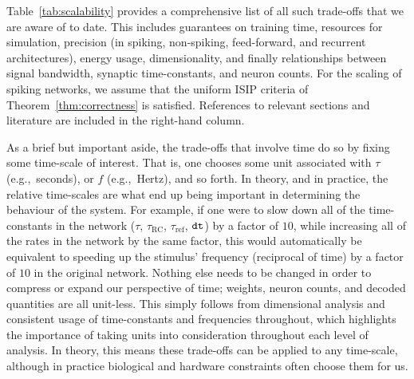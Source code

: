 
Table~\ref{tab:scalability} provides a comprehensive list of all such trade-offs that we are aware of to date.
This includes guarantees on training time, resources for simulation, precision (in spiking, non-spiking, feed-forward, and recurrent architectures), energy usage, dimensionality, and finally relationships between signal bandwidth, synaptic time-constants, and neuron counts.
For the scaling of spiking networks, we assume that the uniform ISIP criteria of Theorem~\ref{thm:correctness} is satisfied.
References to relevant sections and literature are included in the right-hand column.

As a brief but important aside, the trade-offs that involve time do so by fixing some time-scale of interest.
That is, one chooses some unit associated with $\tau$ (e.g.,~seconds), or $f$ (e.g.,~Hertz), and so forth.
In theory, and in practice, the relative time-scales are what end up being important in determining the behaviour of the system.
For example, if one were to slow down all of the time-constants in the network ($\tau$, $\tau_\text{RC}$, $\tau_\text{ref}$, $\texttt{dt}{}$) by a factor of $10$, while increasing all of the rates in the network by the same factor, this would automatically be equivalent to speeding up the stimulus' frequency (reciprocal of time) by a factor of $10$ in the original network.
Nothing else needs to be changed in order to compress or expand our perspective of time; weights, neuron counts, and decoded quantities are all unit-less.
This simply follows from dimensional analysis and consistent usage of time-constants and frequencies throughout, which highlights the importance of taking units into consideration throughout each level of analysis.
In theory, this means these trade-offs can be applied to any time-scale, although in practice biological and hardware constraints often choose them for us.

\iffalse
\TODO{Discuss all of the scaling.}
We usually set $n$ to about $50 \times q$, as this has been found to provide tolerable performance in practice~\citep{braindrop2019}. 
More neurons may be required depending on the difficulty of the function and the frequency of the inputs.
For a fixed amount of noise in a represention implemented by an ensemble of $n$ neurons, the current best-known lower-bound predicts the dimensionality $d$ scales as $\Omega \left( n^{\frac{2}{3}} \right)$ for $n$ neurons~citep[][p.~60]{jgosmann2018}.
Although we don't know the upper-bound, we conjecture that it is $\bigoh{n}$.
That is, the dimensionality should not be able to scale faster than the neuron count.
If it could, then each neuron would represent $\omega(1)$ dimensions, which seems physically implausible given access to only $\bigoh{1}$ state variables.
This limitation could be broken by dendritic computation, for instance if each neuron had access to $\bigoh{n}$ variables distributed along the dendritic tree.
\fi

